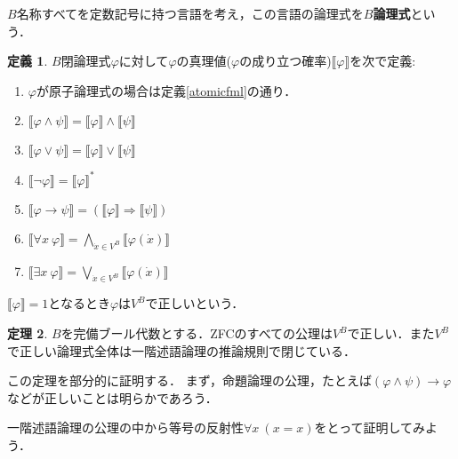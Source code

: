 \documentclass[uplatex,dvipdfmx]{jsarticle}
\newcommand{\truth}[1] {\llbracket #1 \rrbracket}
\theoremstyle{definition}
\newtheorem{thm}{定理}
\newtheorem{defi}[thm]{定義}
\begin{document}
$B$名称すべてを定数記号に持つ言語を考え，この言語の論理式を{\bfseries $B$論理式}という．

\begin{defi}
$B$閉論理式$\varphi$に対して$\varphi$の真理値($\varphi$の成り立つ確率)$\truth{\varphi}$を次で定義:
\begin{enumerate}
    \item $\varphi$が原子論理式の場合は定義\ref{atomicfml}の通り．
    \item $\truth{\varphi \land \psi} = \truth{\varphi} \land \truth{\psi}$
    \item $\truth{\varphi \lor \psi} = \truth{\varphi} \lor \truth{\psi}$
    \item $\truth{\neg \varphi} = \truth{\varphi}^*$
    \item $\truth{\varphi \to \psi} = (\truth{\varphi} \Rightarrow \truth{\psi})$
    \item $\truth{\forall x\ \varphi} = \bigwedge_{\dot{x} \in V^B} \truth{\varphi(\dot{x})}$
    \item $\truth{\exists x\ \varphi} = \bigvee_{\dot{x} \in V^B} \truth{\varphi(\dot{x})}$
\end{enumerate}
\end{defi}

$\truth{\varphi} = 1$となるとき$\varphi$は$V^B$で正しいという．

\begin{thm}
$B$を完備ブール代数とする．ZFCのすべての公理は$V^B$で正しい．また$V^B$で正しい論理式全体は一階述語論理の推論規則で閉じている．
\end{thm}

この定理を部分的に証明する．
まず，命題論理の公理，たとえば$(\varphi \land \psi)\to \varphi$などが正しいことは明らかであろう．

一階述語論理の公理の中から等号の反射性$\forall x\ (x = x)$をとって証明してみよう．
\end{document}
